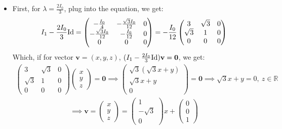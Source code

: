 \documentclass{article}
\newcommand{\RR}{\mathbb{R}}
\newcommand{\Id}{\textmd{Id}} %
\newcommand{\bv}{\textbf{v}} %
\newcommand{\bzero}{\textbf{0}}
\begin{document}
\begin{itemize}
    \item First, for $\lambda=\frac{2I_0}{3}$, plug into the equation, we get:
    \begin{align}
        I_1-\frac{2I_0}{3}\Id = \begin{pmatrix}
            -\frac{I_0}{4}& -\frac{\sqrt{3}I_0}{12} & 0\\
            -\frac{\sqrt{3}I_0}{12} & -\frac{I_0}{12}& 0\\
            0&0&0
        \end{pmatrix} = -\frac{I_0}{12}\begin{pmatrix}
            3&\sqrt{3}&0\\
            \sqrt{3}&1&0\\
            0&0&0
        \end{pmatrix}
    \end{align}
    Which, if for vector $\bv=(x,y,z)$, $(I_1-\frac{2I_0}{3}\Id)\bv = \bzero$, we get:
    \begin{align}
        \begin{pmatrix}
            3&\sqrt{3}&0\\
            \sqrt{3}&1&0\\
            0&0&0
        \end{pmatrix}\begin{pmatrix}
            x\\y\\z
        \end{pmatrix}=\bzero \implies \begin{pmatrix}
            \sqrt{3}(\sqrt{3}x+y)\\ \sqrt{3}x+y\\ 0
        \end{pmatrix} = \bzero \implies \sqrt{3}x+y=0,\ z\in\RR
    \end{align}
    \begin{align}
        \implies \bv = \begin{pmatrix}
            x\\y\\z
        \end{pmatrix} = \begin{pmatrix}
            1\\-\sqrt{3}\\0
        \end{pmatrix}x+\begin{pmatrix}
            0\\0\\1

\end{pmatrix}
\end{align}
\end{itemize}
\end{document}
